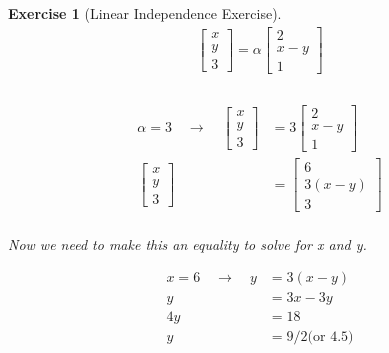 \documentclass[12pt]{article}
\theoremstyle{plain}
\theoremstyle{nonumberplain}
\theoremstyle{plain}
\newtheorem{exercise}[lemma]{Exercise}
\theoremstyle{nonumberplain}
\newcommand\1{{\bf 1}}
\newcommand{\bmat}[1]{\begin{bmatrix*} #1 \end{bmatrix*}} %
\newcommand{\<}{\left\langle}
\renewcommand{\>}{\right\rangle}
\begin{document}
\begin{exercise} [Linear Independence Exercise]
\begin{equation}
\begin{split}
	\bmat{x\\ y\\ 3} = \alpha\bmat{2\\ x-y\\ 1}\\
\end{split}
\end{equation}
\\
\begin{equation*}
\begin{split}
	\alpha = 3 \quad \rightarrow \quad \bmat{x\\ y\\ 3} &= 3\bmat{2\\ x-y\\ 1}\\
	\bmat{x\\ y\\ 3} &= \bmat{6\\ 3(x-y)\\ 3}\\ 
\end{split}
\end{equation*}
\begin{center}
Now we need to make this an equality to solve for x and y.
\end{center}
\begin{equation*}
\begin{split}
	x = 6 \quad \rightarrow \quad y &= 3(x-y)\\
	y &= 3x - 3y\\
	4y &= 18\\
	y &= 9/2 \text{(or 4.5)}
\end{split}
\end{equation*}
\end{exercise}

\pagebreak
\end{document}
